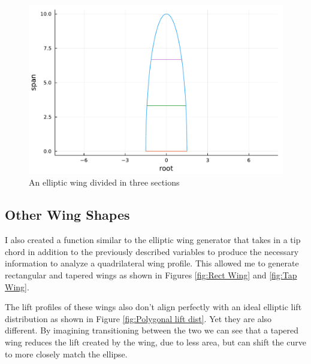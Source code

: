 \documentclass{article}
\begin{document}
\begin{figure}[h]
\centering
\includegraphics[width=.55\linewidth]{eliptic_wing_section_plot.pdf}
\caption{\label{fig:Elliptic wing profile}An elliptic wing divided in three sections}
\end{figure}

\subsection{Other Wing Shapes}
I also created a function similar to the elliptic wing generator that takes in a tip chord in addition to the previously described variables to produce the necessary information to analyze a quadrilateral wing profile. This allowed me to generate rectangular and tapered wings as shown in Figures \ref{fig:Rect Wing} and \ref{fig:Tap Wing}. 

The lift profiles of these wings also don't align perfectly with an ideal elliptic lift distribution as shown in Figure \ref{fig:Polygonal lift dist}. Yet they are also different. By imagining transitioning between the two we can see that a tapered wing reduces the lift created by the wing, due to less area, but can shift the curve to more closely match the ellipse.
\end{document}
